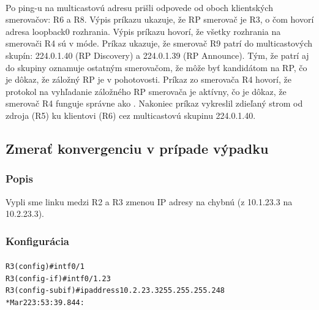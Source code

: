 \documentclass[12pt,twoside,a4paper]{report}
\begin{document}
\paragraph{}
Po ping-u na multicastovú adresu prišli odpovede od oboch klientských smerovačov: R6 a R8. Výpis príkazu  ukazuje, že RP smerovač je R3, o čom hovorí adresa loopback0 rozhrania. Výpis príkazu  hovorí, že všetky rozhrania na smerovači R4 sú v  móde. Príkaz  ukazuje, že smerovač R9 patrí do multicastových skupín: 224.0.1.40 (RP Discovery) a 224.0.1.39 (RP Announce). Tým, že patrí aj do skupiny  oznamuje ostatným smerovačom, že môže byť kandidátom na RP, čo je dôkaz, že záložný RP je v pohotovosti. Príkaz  zo smerovača R4 hovorí, že  protokol na vyhľadanie záložného RP smerovača je aktívny, čo je dôkaz, že smerovač R4 funguje správne ako . Nakoniec príkaz  vykreslil zdieľaný strom od zdroja (R5) ku klientovi (R6) cez multicastovú skupinu 224.0.1.40.







\subsection{Zmerať konvergenciu v prípade výpadku}
\subsubsection{Popis}
Vypli sme linku  medzi R2 a R3 zmenou IP adresy na chybnú (z 10.1.23.3 na 10.2.23.3).

\subsubsection{Konfigurácia}
\paragraph{}

\noindent
{\selectfont
\begin{small}
\begin{alltt}
R3(config)#int f0/1 
R3(config-if)#int f0/1.23     
R3(config-subif)#ip address 10.2.23.3 255.255.255.248
*Mar  2 23:53:39.844: %

\end{alltt}
\end{small}
}
\end{document}
